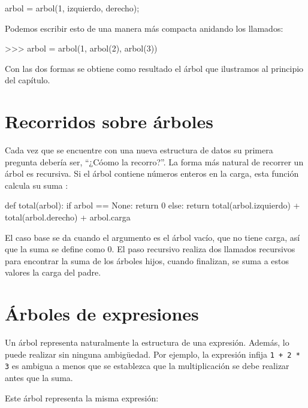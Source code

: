 \beforeverb 
\begin{pythoncode}
arbol = arbol(1, izquierdo, derecho);
\end{pythoncode}
\afterverb Podemos escribir esto de una manera más compacta anidando
los llamados:

\beforeverb 
\begin{pyconcode}
>>> arbol = arbol(1, arbol(2), arbol(3))
\end{pyconcode}
\afterverb Con las dos formas se obtiene como resultado el árbol
que ilustramos al principio del capítulo.

\section{Recorridos sobre árboles}

  

Cada vez que se encuentre con una nueva estructura de datos su primera
pregunta debería ser, ``¿Cóomo la recorro?''. La forma más natural
de recorrer un árbol es recursiva. Si el árbol contiene números enteros
en la carga, esta función calcula su suma :

\beforeverb 
\begin{pythoncode}
def total(arbol):
  if arbol == None: 
     return 0
  else:
     return total(arbol.izquierdo) + total(arbol.derecho) 
            + arbol.carga
\end{pythoncode}
\afterverb El caso base se da cuando el argumento es el árbol vacío,
que no tiene carga, así que la suma se define como 0. El paso recursivo
realiza dos llamados recursivos para encontrar la suma de los árboles
hijos, cuando finalizan, se suma a estos valores la carga del padre.

\section{Árboles de expresiones}

  
  

Un árbol representa naturalmente la estructura de una expresión. Además,
lo puede realizar sin ninguna ambigüedad. Por ejemplo, la expresión
infija \texttt{1 + 2 {*} 3} es ambigua a menos que se establezca que
la multiplicación se debe realizar antes que la suma.

Este árbol representa la misma expresión:

